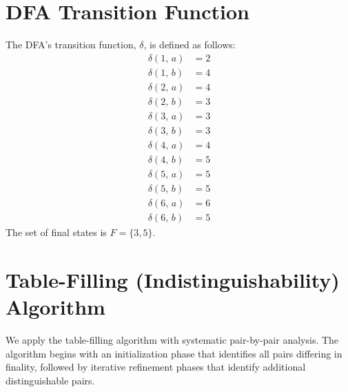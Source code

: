 \documentclass{article}
\begin{document}
\section{DFA Transition Function}

The DFA's transition function, $\delta$, is defined as follows:
\begin{align*}\delta(1,\,a) &= 2\\[0.5em]\delta(1,\,b) &= 4\\[1em]\delta(2,\,a) &= 4\\[0.5em]\delta(2,\,b) &= 3\\[1em]\delta(3,\,a) &= 3\\[0.5em]\delta(3,\,b) &= 3\\[1em]\delta(4,\,a) &= 4\\[0.5em]\delta(4,\,b) &= 5\\[1em]\delta(5,\,a) &= 5\\[0.5em]\delta(5,\,b) &= 5\\[1em]\delta(6,\,a) &= 6\\[0.5em]\delta(6,\,b) &= 5\end{align*}
The set of final states is $F = \{ 3, 5 \}$.

\section{Table-Filling (Indistinguishability) Algorithm}

We apply the table-filling algorithm with systematic pair-by-pair analysis. The algorithm begins with an initialization phase that identifies all pairs differing in finality, followed by iterative refinement phases that identify additional distinguishable pairs.
\end{document}
